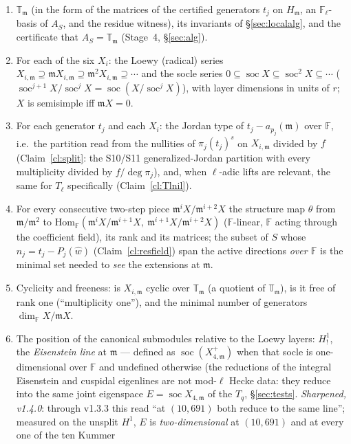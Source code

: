 \documentclass[11pt]{article}
\theoremstyle{remark}
\newcommand{\F}{\mathbb{F}}
\newcommand{\Hom}{\mathrm{Hom}}
\newcommand{\Fl}{\F_\ell}
\DeclareMathOperator{\soc}{soc}
\newcommand{\T}{\mathbb{T}}
\newcommand{\m}{\mathfrak{m}}
\begin{document}
\begin{enumerate}[label=(D\arabic*)]
\item\label{D1} $\T_\m$ (in the form of the matrices of the certified generators
  $t_j$ on $H_\m$, an $\Fl$-basis of $A_S$, and the residue witness), its invariants of
  \S\ref{sec:localalg}, and the certificate that $A_S=\T_\m$ (Stage~4, \S\ref{sec:alg}).
\item\label{D2} For each of the six $X_i$: the Loewy (radical) series
  $X_{i,\m}\supseteq\m X_{i,\m}\supseteq\m^2X_{i,\m}\supseteq\cdots$ and the socle series
  $0\subseteq\soc X\subseteq\soc^2X\subseteq\cdots$ ($\soc^{j+1}X/\soc^jX=\soc(X/\soc^jX)$),
  with layer dimensions in units of $r$; $X$ is semisimple iff $\m X=0$.
\item\label{D3} For each generator $t_j$ and each $X_i$: the Jordan type of $t_j-a_{p_j}(\m)$
  over $\F$, i.e.\ the partition read from the nullities of $\pi_j(t_j)^s$ on $X_{i,\m}$ divided
  by $f$ (Claim~\ref{cl:split}: the S10/S11 generalized-Jordan partition with every multiplicity
  divided by $f/\deg\pi_j$), and, when
  $\ell$-adic lifts are relevant, the same for $T_\ell$ specifically (Claim~\ref{cl:Tlnil}).
\item\label{D4} For every consecutive two-step piece $\m^iX/\m^{i+2}X$ the structure map
  $\theta$ from $\m/\m^2$ to $\Hom_\F(\m^iX/\m^{i+1}X,\ \m^{i+1}X/\m^{i+2}X)$ ($\F$-linear, $\F$
  acting through the coefficient field), its rank and its matrices; the subset of $S$ whose
  $n_j=t_j-P_j(\hat w)$ (Claim~\ref{cl:resfield}) span the active directions \emph{over $\F$} is
  the minimal set needed to \emph{see} the extensions at $\m$.
\item\label{D5} Cyclicity and freeness: is $X_{i,\m}$ cyclic over $\T_\m$ (a quotient of
  $\T_\m$), is it free of rank one (``multiplicity one''), and the minimal number of generators
  $\dim_\F X/\m X$.
\item\label{D6} The position of the canonical submodules relative to the Loewy layers: $H^1_!$,
  the \emph{Eisenstein line} at $\m$ --- defined as $\soc(X^+_{4,\m})$ when that socle is
  one-dimensional over $\F$ and undefined otherwise (the reductions of the integral Eisenstein
  and cuspidal eigenlines are not mod-$\ell$ Hecke data: they reduce into the same joint
  eigenspace $E=\soc X_{4,\m}$ of the $T_q$, \S\ref{sec:tests}. \emph{Sharpened, v1.4.0}:
  through v1.3.3 this read ``at $(10,691)$ both reduce to the same line''; measured on the
  unsplit $H^1$, $E$ is \emph{two-dimensional} at $(10,691)$ and at every one of the ten Kummer

\end{enumerate}
\end{document}
